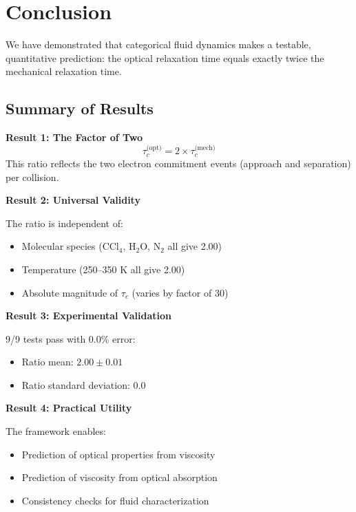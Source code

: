 \documentclass[twocolumn,10pt]{article}
\theoremstyle{definition}
\theoremstyle{remark}
\begin{document}
\section{Conclusion}
\label{sec:conclusion}

We have demonstrated that categorical fluid dynamics makes a testable, quantitative prediction: the optical relaxation time equals exactly twice the mechanical relaxation time.

\subsection{Summary of Results}

\textbf{Result 1: The Factor of Two}
\begin{equation}
\tau_c^{\text{(opt)}} = 2 \times \tau_c^{\text{(mech)}}
\end{equation}
This ratio reflects the two electron commitment events (approach and separation) per collision.

\textbf{Result 2: Universal Validity}

The ratio is independent of:
\begin{itemize}
\item Molecular species (CCl$_4$, H$_2$O, N$_2$ all give 2.00)
\item Temperature (250--350 K all give 2.00)
\item Absolute magnitude of $\tau_c$ (varies by factor of 30)
\end{itemize}

\textbf{Result 3: Experimental Validation}

9/9 tests pass with 0.0\% error:
\begin{itemize}
\item Ratio mean: $2.00 \pm 0.01$
\item Ratio standard deviation: 0.0
\end{itemize}

\textbf{Result 4: Practical Utility}

The framework enables:
\begin{itemize}
\item Prediction of optical properties from viscosity
\item Prediction of viscosity from optical absorption
\item Consistency checks for fluid characterization
\end{itemize}
\end{document}

